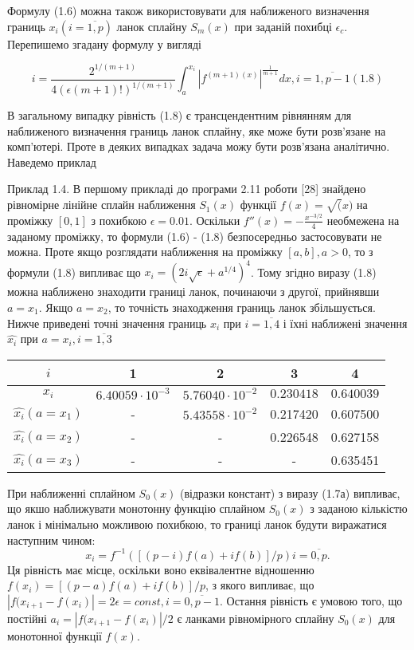 \documentclass[ukrainian,14pt]{extarticle}
\begin{document}
Формулу (1.6) можна також використовувати для наближеного визначення границь $x_i (i = \overline{1,p})$ ланок сплайну $S_m(x)$ при заданій похибці $\epsilon_c$. Перепишемо згадану формулу у вигляді

$$i = \frac{2^{1/(m+1)}}{4(\epsilon (m+1)!)^{1/(m+1)}} \int_a^{x_i} \left| f^{(m+1) (x)} \right|^{\frac{1}{m+1}} dx, i = \overline{1, p-1} (1.8)$$ 

В загальному випадку рівність (1.8) є трансцендентним рівнянням для наближеного визначення границь ланок сплайну, яке може бути розв'язане на комп'ютері. Проте в деяких випадках задача можу бути розв'язана аналітично. Наведемо приклад

Приклад 1.4. В першому прикладі до програми 2.11 роботи [28] знайдено рівномірне лінійне сплайн наближення $S_1(x)$ функції $f(x) = \sqrt(x)$ на проміжку $[0,1]$ з похибкою $\epsilon = 0.01$. Оскільки $f''(x) = -\frac{x^{-3/2}}{4}$ необмежена на заданому проміжку, то формули (1.6) - (1.8) безпосередньо застосовувати не можна. Проте якщо розглядати наближення на проміжку $[a, b], a > 0$, то з формули (1.8) випливає що $x_i = (2i \sqrt{\epsilon} + a^{1/4})^{4}$. Тому згідно виразу (1.8) можна наближено знаходити границі ланок, починаючи з другої, прийнявши $a = x_1$. Якщо $a = x_2$, то точність знаходження границь ланок збільшується. Нижче приведені точні значення границь $x_i$ при $i = \overline{1, 4}$ і їхні наближені значення $\hat{x_i}$ при $a = x_i, i = \overline{1,3}$


\bgroup
\def\arraystretch{1.5}
\begin{center}
\begin{tabular}{ c | c |
c | c | c }
 $i$ & 1 & 2 & 3 & 4 \\
 \hline
 $x_i$ & $6.40059 \cdot 10^{-3}$ & $5.76040 \cdot 10^{-2}$ & $0.230418$ & $0.640039$ \\  
 \hline
  $\hat{x_i} (a = x_1)$ & - & $5.43558 \cdot 10^{-2}$ & 0.217420 & 0.607500 \\  
 \hline
 $\hat{x_i} (a = x_2)$ & - & - & 0.226548 & 0.627158   \\
 \hline
   $\hat{x_i} (a = x_3)$ & - & - & - & 0.635451 \\  
\end{tabular}
\end{center}
\egroup

При наближенні сплайном $S_0(x)$ (відразки констант) з виразу (1.7а) випливає, що якшо наближувати монотонну функцію сплайном $S_0(x)$ з заданою кількістю ланок і мінімально можливою похибкою, то границі ланок будути виражатися наступним чином:
$$x_i = f^{-1}([(p - i)f(a) + if(b)] / p) i = \overline{0, p}.$$
Ця рівність має місце, оскільки воно еквівалентне відношенню $f(x_i) = [(p-a)f(a) + if(b)]/p$, з якого випливає, що $|f(x_{i+1} - f(x_i)| = 2\epsilon = const, i = \overline{0, p-1}$. Остання рівність є умовою того, що постійні $a_i = |f(x_{i+1}- f(x_i)| / 2$ є ланками рівномірного сплайну $S_0(x)$ для монотонної функції $f(x)$.
\end{document}
